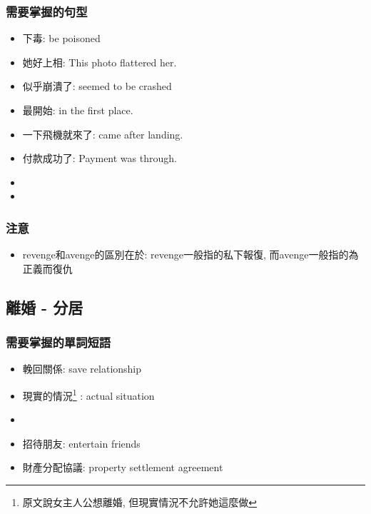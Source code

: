 \subsubsection*{需要掌握的句型}
\begin{multicols}{2}
\begin{itemize}
  \itemsep0em
  \item 下毒: be poisoned
  \item 她好上相: This photo flattered her.
  \item 似乎崩潰了: seemed to be crashed
  \item 最開始: in the first place.
  \item 一下飛機就來了: came  after landing.
  \item 付款成功了: Payment was through.
  \item {}
  \item {}
\end{itemize}
\end{multicols}

\subsubsection*{注意}
\begin{itemize}
  \itemsep0em
  \item revenge和avenge的區別在於: revenge一般指的私下報復, 而avenge一般指的為正義而復仇
\end{itemize}

\subsection{離婚 - 分居}
\subsubsection*{需要掌握的單詞短語}
\begin{multicols}{2}
\begin{itemize}
  \itemsep0em
  \item 輓回關係: save relationship
  \item 現實的情況\footnote{原文說女主人公想離婚, 但現實情況不允許她這麼做} : actual situation
  \item {}
  \item 招待朋友: entertain friends
  \item 財產分配協議: property settlement agreement
\end{itemize}
\end{multicols}

